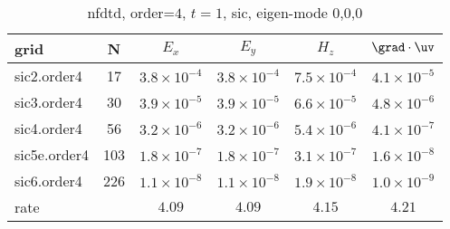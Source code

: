 \begin{table}[hbt]
\begin{center}
\begin{tabular}{|l|c|c|c|c|c|} \hline\hline 
grid  & N &  $E_x$ &  $E_y$ & $H_z$ & $\grad\cdot\uv$\\ \hline 
         sic2.order4 &    17 &  $3.8\times10^{ -4}$  &  $3.8\times10^{ -4}$  &  $7.5\times10^{ -4}$  &  $4.1\times10^{ -5}$   \\ \hline
         sic3.order4 &    30 &  $3.9\times10^{ -5}$  &  $3.9\times10^{ -5}$  &  $6.6\times10^{ -5}$  &  $4.8\times10^{ -6}$   \\ \hline
         sic4.order4 &    56 &  $3.2\times10^{ -6}$  &  $3.2\times10^{ -6}$  &  $5.4\times10^{ -6}$  &  $4.1\times10^{ -7}$   \\ \hline
        sic5e.order4 &   103 &  $1.8\times10^{ -7}$  &  $1.8\times10^{ -7}$  &  $3.1\times10^{ -7}$  &  $1.6\times10^{ -8}$   \\ \hline
         sic6.order4 &   226 &  $1.1\times10^{ -8}$  &  $1.1\times10^{ -8}$  &  $1.9\times10^{ -8}$  &  $1.0\times10^{ -9}$   \\ \hline
    rate            &     &       $4.09$ &       $4.09$ &       $4.15$ &       $4.21$  \\ \hline\hline
\end{tabular}
\caption{nfdtd, order=$4$, $t=1$, sic, eigen-mode 0,0,0}\label{table:mx.sic}
\end{center}
\end{table}

